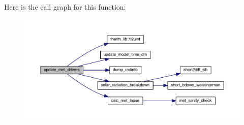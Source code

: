 Here is the call graph for this function\+:\nopagebreak
\begin{figure}[H]
\begin{center}
\leavevmode
\includegraphics[width=350pt]{ed__met__driver_8f90_a733afbe45244033876caaa6e09cb053c_cgraph}
\end{center}
\end{figure}


